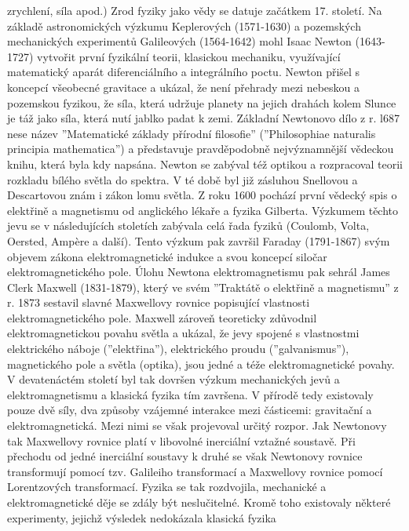     zrychlení, síla apod.) Zrod fyziky jako vědy se datuje začátkem 17. století. Na základě  
    astronomických výzkumu Keplerových (1571-1630) a pozemských mechanických experimentů Galileových 
    (1564-1642) mohl Isaac Newton (1643-1727) vytvořit první fyzikální teorii, klasickou mechaniku,   
    využívající matematický aparát diferenciálního a integrálního poctu. Newton přišel s koncepcí   
    všeobecné gravitace a ukázal, že není přehrady mezi nebeskou a pozemskou fyzikou, že síla, která    
    udržuje planety na jejich drahách kolem Slunce je táž jako síla, která nutí jablko padat k zemi. 
    Základní Newtonovo dílo z r. l687 nese název ”Matematické základy přírodní filosofie” (”Philosophiae 
    naturalis principia mathematica”) a představuje pravděpodobně nejvýznamnější vědeckou knihu, která 
    byla kdy napsána. Newton se zabýval též optikou a rozpracoval teorii rozkladu bílého světla do 
    spektra. V té době byl již zásluhou Snellovou a Descartovou znám i zákon lomu světla. Z roku 1600 
    pochází první vědecký spis o elektřině a magnetismu od anglického lékaře a fyzika Gilberta. Výzkumem 
    těchto jevu se v následujících stoletích zabývala celá řada fyziků (Coulomb, Volta, Oersted, 
    Amp\`{e}re a další). Tento výzkum pak završil Faraday (1791-1867) svým objevem zákona 
    elektromagnetické indukce a svou koncepcí siločar elektromagnetického pole. Úlohu Newtona 
    elektromagnetismu pak sehrál James Clerk Maxwell (1831-1879), který ve svém ”Traktátě o elektřině a 
    magnetismu” z r. 1873 sestavil slavné Maxwellovy rovnice popisující vlastnosti elektromagnetického 
    pole. Maxwell zároveň teoreticky zdůvodnil elektromagnetickou povahu světla a ukázal, že jevy spojené 
    s vlastnostmi elektrického náboje (”elektřina”), elektrického proudu (”galvanismus”), magnetického 
    pole a světla (optika), jsou jedné a téže elektromagnetické povahy. V devatenáctém století byl tak 
    dovršen výzkum mechanických jevů a elektromagnetismu a klasická fyzika tím za\-vršena. V přírodě tedy 
    existovaly pouze dvě síly, dva způsoby vzájemné interakce mezi částicemi: gravitační a 
    elektromagnetická. Mezi nimi se však projevoval určitý rozpor. Jak Newtonovy tak Maxwellovy rovnice 
    platí v libovolné inerciální vztažné soustavě. Při přechodu od jedné inerciální soustavy k druhé se 
    však Newtonovy rovnice transformují pomocí tzv. Galileiho transformací a Maxwellovy rovnice pomocí 
    Lorentzových transformací. Fyzika se tak rozdvojila, mechanické a elektromagnetické děje se zdály být 
    neslučitelné. Kromě toho existovaly některé experimenty, jejichž výsledek nedokázala klasická fyzika 
